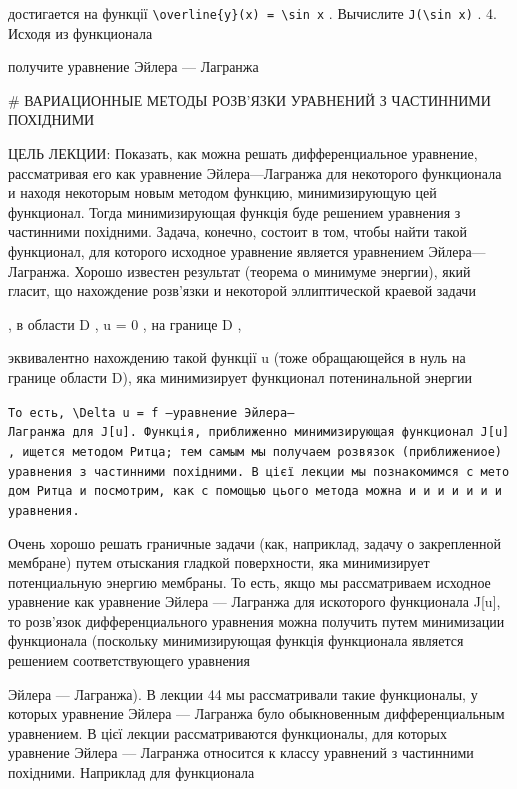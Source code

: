 \documentclass[
  ukrainian,
]{article}
\begin{document}
достигается на функції
\texttt{\textbackslash{}overline\{y\}(x)\ =\ \textbackslash{}sin\ x} .
Вычислите \texttt{J(\textbackslash{}sin\ x)} . 4. Исходя из функционала

получите уравнение Эйлера --- Лагранжа

\# ВАРИАЦИОННЫЕ МЕТОДЫ РОЗВ'ЯЗКИ УРАВНЕНИЙ З ЧАСТИННИМИ ПОХІДНИМИ

ЦЕЛЬ ЛЕКЦИИ: Показать, как можна решать дифференциальное уравнение,
рассматривая его как уравнение Эйлера---Лагранжа для некоторого
функционала и находя некоторым новым методом функцию, минимизирующую цей
функционал. Тогда минимизирующая функція буде решением уравнения з
частинними похідними. Задача, конечно, состоит в том, чтобы найти такой
функционал, для которого исходное уравнение является уравнением
Эйлера---Лагранжа. Хорошо известен результат (теорема о минимуме
энергии), який гласит, що нахождение розв'язки и некоторой эллиптической
краевой задачи

, в области D , u = 0 , на границе D ,

эквивалентно нахождению такой функції u (тоже обращающейся в нуль на
границе области D), яка минимизирует функционал потенинальной энергии

\texttt{То\ есть,\ \textquotesingle{}\textbackslash{}Delta\ u\ =\ f\textquotesingle{}\ —уравнение\ Эйлера—Лагранжа\ для\ J{[}u{]}.\ Функція,\ приближенно\ минимизирующая\ функционал\ J{[}u{]},\ ищется\ методом\ Ритца;\ тем\ самым\ мы\ получаем\ розв\textquotesingle{}язок\ (приближениое)\ уравнения\ з\ частинними\ похідними.\ В\ цієї\ лекции\ мы\ познакомимся\ с\ методом\ Ритца\ и\ посмотрим,\ как\ с\ помощью\ цього\ метода\ можна\ и\ и\ и\ и\ и\ и\ и\ уравнения.}

Очень хорошо решать граничные задачи (как, наприклад, задачу о
закрепленной мембране) путем отыскания гладкой поверхности, яка
минимизирует потенциальную энергию мембраны. То есть, якщо мы
рассматриваем исходное уравнение как уравнение Эйлера --- Лагранжа для
искоторого функционала J{[}u{]}, то розв'язок дифференциального
уравнения можна получить путем минимизации функционала (поскольку
минимизирующая функція функционала является решением соответствующего
уравнения

Эйлера --- Лагранжа). В лекции 44 мы рассматривали такие функционалы, у
которых уравнение Эйлера --- Лагранжа було обыкновенным дифференциальным
уравнением. В цієї лекции рассматриваются функционалы, для которых
уравнение Эйлера --- Лагранжа относится к классу уравнений з частинними
похідними. Наприклад для функционала
\end{document}
